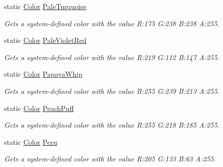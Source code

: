 \begin{DoxyCompactItemize}
static \hyperlink{struct_microsoft_1_1_xna_1_1_framework_1_1_color}{Color} \hyperlink{struct_microsoft_1_1_xna_1_1_framework_1_1_color_a9b5a618ea68186c5843d5b8f99d07048}{Pale\+Turquoise}
\begin{DoxyCompactList}\small\item\em Gets a system-\/defined color with the value R\+:175 G\+:238 B\+:238 A\+:255.\end{DoxyCompactList}\item 
static \hyperlink{struct_microsoft_1_1_xna_1_1_framework_1_1_color}{Color} \hyperlink{struct_microsoft_1_1_xna_1_1_framework_1_1_color_a2215b93d420e1b6a55959d2201f89dc3}{Pale\+Violet\+Red}
\begin{DoxyCompactList}\small\item\em Gets a system-\/defined color with the value R\+:219 G\+:112 B\+:147 A\+:255.\end{DoxyCompactList}\item 
static \hyperlink{struct_microsoft_1_1_xna_1_1_framework_1_1_color}{Color} \hyperlink{struct_microsoft_1_1_xna_1_1_framework_1_1_color_a10b6a2d00456018d3d18dd62f800d733}{Papaya\+Whip}
\begin{DoxyCompactList}\small\item\em Gets a system-\/defined color with the value R\+:255 G\+:239 B\+:213 A\+:255.\end{DoxyCompactList}\item 
static \hyperlink{struct_microsoft_1_1_xna_1_1_framework_1_1_color}{Color} \hyperlink{struct_microsoft_1_1_xna_1_1_framework_1_1_color_aa6a9a00cc007102ea61f64526246e8e8}{Peach\+Puff}
\begin{DoxyCompactList}\small\item\em Gets a system-\/defined color with the value R\+:255 G\+:218 B\+:185 A\+:255.\end{DoxyCompactList}\item 
static \hyperlink{struct_microsoft_1_1_xna_1_1_framework_1_1_color}{Color} \hyperlink{struct_microsoft_1_1_xna_1_1_framework_1_1_color_aa776b1abb6088bc4901b349c3cd7de56}{Peru}
\begin{DoxyCompactList}\small\item\em Gets a system-\/defined color with the value R\+:205 G\+:133 B\+:63 A\+:255.\end{DoxyCompactList}\item 

\end{DoxyCompactItemize}
